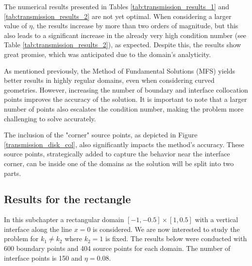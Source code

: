 The numerical results presented in Tables \ref{tab:transmission_results_1} and \ref{tab:transmission_results_2} are not yet optimal. When considering a larger value of \(\eta\), the results increase by more than two orders of magnitude, but this also leads to a significant increase in the already very high condition number (see Table \ref{tab:transmission_results_2}), as expected. Despite this, the results show great promise, which was anticipated due to the domain's analyticity.

As mentioned previously, the Method of Fundamental Solutions (\ac{MFS}) yields better results in highly regular domains, even when considering curved geometries. However, increasing the number of boundary and interface collocation points improves the accuracy of the solution. It is important to note that a larger number of points also escalates the condition number, making the problem more challenging to solve accurately.

The inclusion of the "corner" source points, as depicted in Figure \ref{transmission_disk_col}, also significantly impacts the method's accuracy. These source points, strategically added to capture the behavior near the interface corner, can be inside one of the domains as the solution will be split into two parts.

\subsection{Results for the rectangle}

In this subchapter a rectangular domain \([-1, -0.5] \times [1, 0.5]\) with a vertical interface along the line \(x=0\) is considered. We are now interested to study the problem for \(k_1 \neq k_2\) where \(k_2=1\) is fixed. The results below were conducted with 600 boundary points and 404 source points for each domain. The number of interface points is 150 and \(\eta=0.08\).

